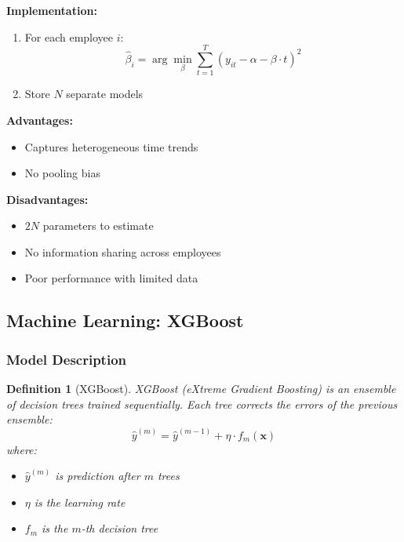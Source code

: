 \documentclass[12pt,a4paper]{article}
\newtheorem{definition}{Definition}[section]
\begin{document}
\textbf{Implementation:}
\begin{enumerate}
    \item For each employee $i$:
    \begin{equation}
    \hat{\beta}_i = \arg\min_{\beta} \sum_{t=1}^{T}(y_{it} - \alpha - \beta \cdot t)^2
    \end{equation}
    \item Store $N$ separate models
\end{enumerate}

\textbf{Advantages:}
\begin{itemize}
    \item Captures heterogeneous time trends
    \item No pooling bias
\end{itemize}

\textbf{Disadvantages:}
\begin{itemize}
    \item $2N$ parameters to estimate
    \item No information sharing across employees
    \item Poor performance with limited data
\end{itemize}

\subsection{Machine Learning: XGBoost}

\subsubsection{Model Description}

\begin{definition}[XGBoost]
XGBoost (eXtreme Gradient Boosting) is an ensemble of decision trees trained sequentially. Each tree corrects the errors of the previous ensemble:
\begin{equation}
\hat{y}^{(m)} = \hat{y}^{(m-1)} + \eta \cdot f_m(\mathbf{x})
\end{equation}
where:
\begin{itemize}
    \item $\hat{y}^{(m)}$ is prediction after $m$ trees
    \item $\eta$ is the learning rate
    \item $f_m$ is the $m$-th decision tree
\end{itemize}
\end{definition}
\end{document}
